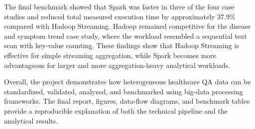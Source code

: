 \documentclass[12pt,a4paper]{article}
\begin{document}
The final benchmark showed that Spark was faster in three of the four case studies and reduced total measured execution time by approximately 37.9\% compared with Hadoop Streaming. Hadoop remained competitive for the disease and symptom trend case study, where the workload resembled a sequential text scan with key-value counting. These findings show that Hadoop Streaming is effective for simple streaming aggregation, while Spark becomes more advantageous for larger and more aggregation-heavy analytical workloads.

Overall, the project demonstrates how heterogeneous healthcare QA data can be standardized, validated, analyzed, and benchmarked using big-data processing frameworks. The final report, figures, data-flow diagrams, and benchmark tables provide a reproducible explanation of both the technical pipeline and the analytical results.



\end{document}
